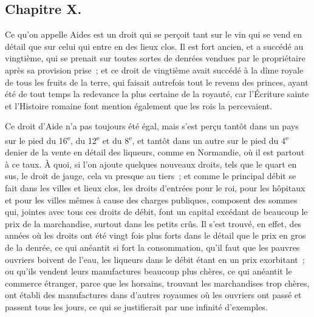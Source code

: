 \documentclass[french,twoside]{book} %
\begin{document}
\subsection[{Chapitre X.}]{Chapitre X.}
\noindent Ce qu’on appelle Aides est un droit qui se perçoit tant sur le vin qui se vend en détail que sur celui qui entre en des lieux clos. Il est fort ancien, et a succédé au vingtième, qui se prenait sur toutes sortes de denrées vendues par le propriétaire après sa provision prise ; et ce droit de vingtième avait succédé à la dîme royale de tous les fruits de la terre, qui faisait autrefois tout le revenu des princes, ayant été de tout temps la redevance la plus certaine de la royauté, car l’Écriture sainte et l’Histoire romaine font mention également que les rois la percevaient.\par
Ce droit d’Aide n’a pas toujours été égal, mais s’est perçu tantôt dans un pays sur le pied du 16\textsuperscript{e}, du 12\textsuperscript{e} et du 8\textsuperscript{e}, et tantôt dans un autre sur le pied du 4\textsuperscript{e} denier de la vente en détail des liqueurs, comme en Normandie, où il est partout à ce taux. À quoi, si l’on ajoute quelques nouveaux droits, tels que le quart en sus, le droit de jauge, cela va presque au tiers ; et comme le principal débit se fait dans les villes et lieux clos, les droits d’entrées pour le roi, pour les hôpitaux et pour les villes mêmes à cause des charges publiques, composent des sommes qui, jointes avec tous ces droits de débit, font un capital excédant de beaucoup le prix de la marchandise, surtout dans les petits crûs. Il s’est trouvé, en effet, des années où les droits ont été vingt fois plus forts dans le détail que le prix en gros de la denrée, ce qui anéantit si fort la consommation, qu’il faut que les pauvres ouvriers boivent de l’eau, les liqueurs dans le débit étant en un prix exorbitant ; ou qu’ils vendent leurs manufactures beaucoup plus chères, ce qui anéantit le commerce étranger, parce que les horsains, trouvant les marchandises trop chères, ont établi des manufactures dans d’autres royaumes où les ouvriers ont passé et passent tous les jours, ce qui se justifierait par une infinité d’exemples.\par
\end{document}
